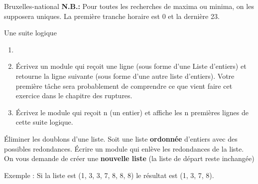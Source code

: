 \begin{Exercice}{Bruxelles-national}
	\textbf{N.B.:} Pour toutes les recherches de maxima ou minima, on les
	supposera uniques. La première tranche horaire est 0 et la dernière 23.
\end{Exercice}

\begin{Exercice}{Une suite logique}

	\begin{enumerate}[label=\alph*)]
		\item 
			\begin{center}
			\begin{minipage}{4.748cm}
			{}

			{}

			{}

			{}

			{}

			{}

			{}

			{}

			{}

			{}
			\end{minipage}
			\end{center}
		\item 
			Écrivez un module qui reçoit une ligne (sous forme
			d'une Liste d'entiers) et retourne la
			ligne suivante (sous forme d'une autre liste
			d'entiers). Votre première tâche sera probablement de
			comprendre ce que vient faire cet exercice dans le chapitre des
			ruptures.
		\item 
			Écrivez le module qui reçoit n (un entier) 
			et affiche les n premières lignes de cette suite
			logique.
	\end{enumerate}
\end{Exercice}

\begin{Exercice}{Éliminer les doublons d'une liste.}
	Soit une liste \textbf{ordonnée}
	d'entiers avec des possibles redondances. Écrire un
	module qui enlève les redondances de la liste. On vous demande de créer
	une \textbf{nouvelle liste} (la liste de départ reste inchangée)

	Exemple : Si la liste est (1, 3, 3, 7, 8, 8, 8) le résultat est (1, 3, 7, 8).
\end{Exercice}
